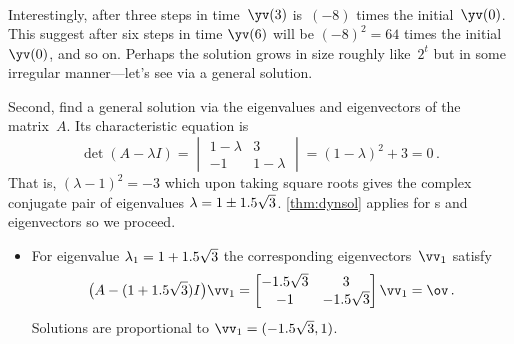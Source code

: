 \begin{example}
\begin{solution}
\begin{eqnarray*}
\end{eqnarray*}
%
Interestingly, after three steps in time~\(\yv(3)\) is~\((-8)\) times the initial~\(\yv(0)\).
This suggest after six steps in time \(\yv(6)\) will be \((-8)^2=64\) times the initial~\(\yv(0)\), and so on.
Perhaps the solution grows in size roughly like~\(2^t\) but in some irregular manner---let's see via a general solution.

Second, find a general solution via the eigenvalues and eigenvectors of the matrix~\(A\).  
Its characteristic equation is 
\begin{equation*}
\det(A-\lambda I)=\begin{vmatrix} 1-\lambda&3\\-1&1-\lambda \end{vmatrix}
=(1-\lambda)^2+3=0\,.
\end{equation*}
That is, \((\lambda-1)^2=-3\) which upon taking square roots gives the complex conjugate pair of eigenvalues \(\lambda=1\pm 1.5\sqrt3\).
\autoref{thm:dynsol} applies for s and eigenvectors so we proceed.
\begin{itemize}
\item For eigenvalue \(\lambda_1=1+1.5\sqrt3\) the corresponding eigenvectors~\(\vv_1\) satisfy
\begin{equation*}
\big(A-(1+\i\sqrt3)I\big)\vv_1=\begin{bmatrix} -\i\sqrt3&3\\-1&-\i\sqrt3 \end{bmatrix}\vv_1=\ov\,.
\end{equation*}
Solutions are proportional to \(\vv_1=(-\i\sqrt3,1)\).


\end{itemize}
\end{solution}
\end{example}
